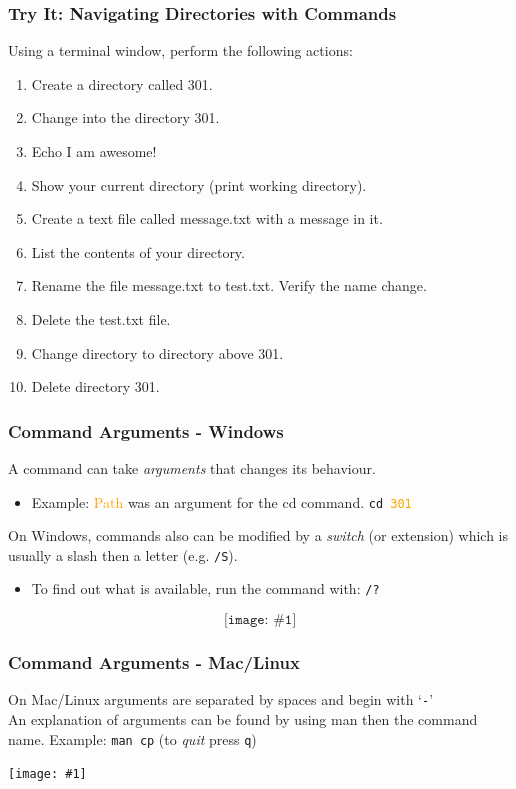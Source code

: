 \documentclass[xcolor=svgnames, colorlinks, handout]{beamer}
\newcommand{\orange}[1]{{\textcolor{orange}{#1}}}
\newcommand{\nl}{\\[1em]}
\newcommand{\ipic}[2]{\texttt{[image: \#1]}}
\newcommand{\ft}[1]{\frametitle{#1}}
\begin{document}






\begin{frame}\ft{Try It: Navigating Directories with Commands}
\begin{example}{}
Using a terminal window, perform the following actions:
\begin{enumerate}
\item Create a directory called 301.
\item Change into the directory 301.
\item Echo I am awesome!
\item Show your current directory (print working directory).
\item Create a text file called message.txt with a message in it.
\item List the contents of your directory.
\item Rename the file message.txt to test.txt.  Verify the name change.
\item Delete the test.txt file.
\item Change directory to directory above 301.
\item Delete directory 301.
\end{enumerate}
\end{example}
\end{frame}

\begin{frame}\ft{Command Arguments - Windows}
A command can take \emph{arguments} that changes its behaviour.
\begin{itemize}
\item Example: \orange{Path} was an argument for the cd command. 
 {\tt cd \orange{301}}\nl
\end{itemize}

On Windows, commands also can be modified by a \emph{switch} (or extension) which is usually a slash then a letter (e.g. {\tt /S}).
\begin{itemize}
\item To find out what is available, run the command with: {\tt /?}
\end{itemize}
$$\ipic{help}{0.99}$$
\end{frame}

\begin{frame}\ft{Command Arguments - Mac/Linux}
On Mac/Linux arguments are separated by spaces and begin with `{\tt -}' \nl
An explanation of arguments can be found by using man then the command name.  Example: {\tt man cp} (to \textit{quit} press {\tt q})
\begin{center}
\ipic{man}{0.7}
\end{center}
\end{frame}
\end{document}
